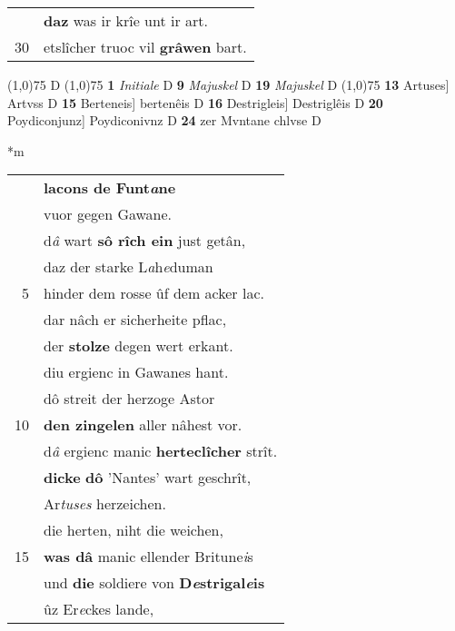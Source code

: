 \documentclass[8pt,a4paper,notitlepage]{article}
\begin{document}
\begin{table}[ht]
\begin{minipage}[t]{0.5\linewidth}
\begin{tabular}{rl}
 & \textbf{daz} was ir krîe unt ir art.\\ 
30 & etslîcher truoc vil \textbf{grâwen} bart.\\ 
\end{tabular}
\scriptsize
\line(1,0){75} \newline
D \newline
\line(1,0){75} \newline
\textbf{1} \textit{Initiale} D  \textbf{9} \textit{Majuskel} D  \textbf{19} \textit{Majuskel} D  \newline
\line(1,0){75} \newline
\textbf{13} Artuses] Artvss D \textbf{15} Berteneis] bertenêis D \textbf{16} Destrigleis] Destriglêis D \textbf{20} Poydiconjunz] Poydiconivnz D \textbf{24} zer Mvntane chlvse D \newline
\end{minipage}
\hspace{0.5cm}
\begin{minipage}[t]{0.5\linewidth}
\small
\begin{center}*m
\end{center}
\begin{tabular}{rl}
 & \textbf{lacons de Funt\textit{a}ne}\\ 
 & vuor gegen Gawane.\\ 
 & d\textit{â} wart \textbf{sô rîch ein} just getân,\\ 
 & daz der starke L\textit{a}h\textit{e}duman\\ 
5 & hinder dem rosse ûf dem acker lac.\\ 
 & dar nâch er sicherheite pflac,\\ 
 & der \textbf{stolze} degen wert erkant.\\ 
 & diu ergienc in Gawanes hant.\\ 
 & dô streit der herzoge Astor\\ 
10 & \textbf{den zingelen} aller nâhest vor.\\ 
 & d\textit{â} ergienc manic \textbf{herteclîcher} strît.\\ 
 & \textbf{dicke} \textbf{dô} 'Nantes' wart geschrît,\\ 
 & Ar\textit{tuses} herzeichen.\\ 
 & die herten, niht die weichen,\\ 
15 & \textbf{was dâ} manic ellender Britune\textit{i}s\\ 
 & und \textbf{die} soldiere von \textbf{D\textit{e}strigal\textit{e}is}\\ 
 & ûz Er\textit{e}ckes lande,\\ 

\end{tabular}
\end{minipage}
\end{table}
\end{document}
